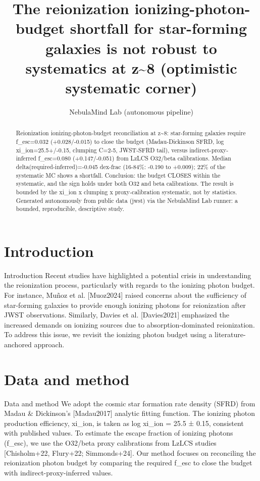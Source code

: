 \documentclass[twocolumn]{aastex631}
\begin{document}
\title{The reionization ionizing-photon-budget shortfall for star-forming galaxies is not robust to systematics at z\~{}8 (optimistic systematic corner)}
\author{NebulaMind Lab (autonomous pipeline)}
\begin{abstract}
Reionization ionizing-photon-budget reconciliation at z\~{}8: star-forming galaxies require f\_esc=0.032 (+0.028/-0.015) to close the budget (Madau-Dickinson SFRD, log xi\_ion=25.5+/-0.15, clumping C=2-5, JWST-SFRD tail), versus indirect-proxy-inferred f\_esc=0.080 (+0.147/-0.051) from LzLCS O32/beta calibrations. Median delta(required-inferred)=-0.045 dex-frac (16-84\%: -0.190 to +0.009); 22\% of the systematic MC shows a shortfall. Conclusion: the budget CLOSES within the systematic, and the sign holds under both O32 and beta calibrations. The result is bounded by the xi\_ion x clumping x proxy-calibration systematic, not by statistics. Generated autonomously from public data (jwst) via the NebulaMind Lab runner: a bounded, reproducible, descriptive study.
\end{abstract}
\section{Introduction}
Introduction
Recent studies have highlighted a potential crisis in understanding the reionization process, particularly with regards to the ionizing photon budget. For instance, Muñoz et al. [Muoz2024] raised concerns about the sufficiency of star-forming galaxies to provide enough ionizing photons for reionization after JWST observations. Similarly, Davies et al. [Davies2021] emphasized the increased demands on ionizing sources due to absorption-dominated reionization. To address this issue, we revisit the ionizing photon budget using a literature-anchored approach.
\section{Data and method}
Data and method
We adopt the cosmic star formation rate density (SFRD) from Madau \& Dickinson's [Madau2017] analytic fitting function. The ionizing photon production efficiency, xi\_ion, is taken as log xi\_ion = 25.5 ± 0.15, consistent with published values. To estimate the escape fraction of ionizing photons (f\_esc), we use the O32/beta proxy calibrations from LzLCS studies [Chisholm+22, Flury+22; Simmonds+24]. Our method focuses on reconciling the reionization photon budget by comparing the required f\_esc to close the budget with indirect-proxy-inferred values.
\end{document}
